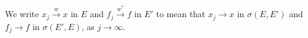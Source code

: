 \documentclass[12 pt]{article}%
\newtheorem{final remark}[theorem]{Final Remark}
\newtheorem{definition}[theorem]{Definition}
\begin{document}
	We write $x_j \overset{w}{\to} x$ in $E$ and $f_j \overset{w^*}{\to} f$ in $E'$ to mean that $x_j \to x$ in $\sigma(E,E')$ and $f_j \to f$ in $\sigma(E', E)$, as $j \to \infty$.
	
%		
%		
%			
%			
%			
%			
%
\end{document}
